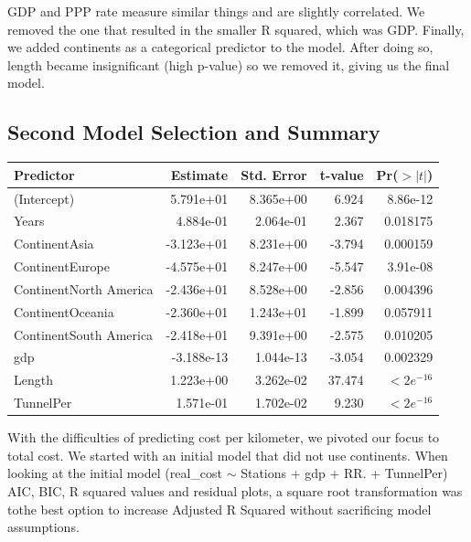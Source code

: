 \documentclass[12pt]{article}
\begin{document}
GDP and PPP rate measure similar things and are slightly correlated. We removed the one that resulted in the smaller R squared, which was GDP. Finally, we added continents as a categorical predictor to the model. After doing so, length became insignificant (high p-value) so we removed it, giving us the final model.



\subsection{Second Model Selection and Summary}

\vspace{12pt}

\begin{tabular}{lrrrr}
\hline
\textbf{Predictor} & \textbf{Estimate} & \textbf{Std. Error} & \textbf{t-value} & \textbf{Pr($>|t|$)} \\
\hline
\label{tab:results}
(Intercept) & 5.791e+01 & 8.365e+00 & 6.924 & 8.86e-12 \\
Years & 4.884e-01 & 2.064e-01 & 2.367 & 0.018175 \\
ContinentAsia & -3.123e+01 & 8.231e+00 & -3.794 & 0.000159 \\
ContinentEurope & -4.575e+01 & 8.247e+00 & -5.547 & 3.91e-08 \\
ContinentNorth America & -2.436e+01 & 8.528e+00 & -2.856 & 0.004396 \\
ContinentOceania & -2.360e+01 & 1.243e+01 & -1.899 & 0.057911 \\
ContinentSouth America & -2.418e+01 & 9.391e+00 & -2.575 & 0.010205 \\
gdp & -3.188e-13 & 1.044e-13 & -3.054 & 0.002329 \\
Length & 1.223e+00 & 3.262e-02 & 37.474 & $< 2e^{-16}$ \\
TunnelPer & 1.571e-01 & 1.702e-02 & 9.230 & $< 2e^{-16}$ \\
\hline
\end{tabular}

\vspace{10pt}
With the difficulties of predicting cost per kilometer, we pivoted our focus to total cost. We started with an initial model that did not use continents. When looking at the initial model (real\_cost $\sim$ Stations + gdp + RR. + TunnelPer) AIC, BIC, R squared values and residual plots, a square root transformation was tothe best option to increase Adjusted R Squared without sacrificing model assumptions.
	
\end{document}
